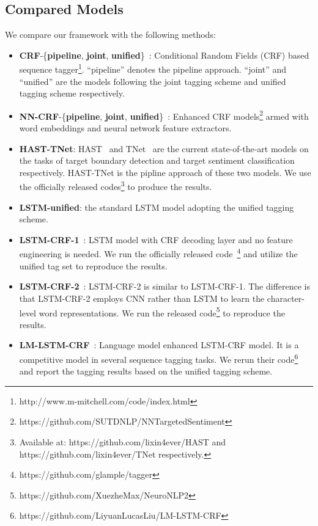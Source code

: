 \documentclass[letterpaper]{article} \usepackage{aaai19}  \usepackage{times}  \usepackage{helvet}  \usepackage{courier}  \usepackage{url}  \usepackage{graphicx}  \frenchspacing  \setlength{\pdfpagewidth}{8.5in}  \setlength{\pdfpageheight}{11in}
\begin{document}
\subsection{Compared Models}
We compare our framework with the following methods:
\begin{itemize}
    \item \textbf{CRF}-\{\textbf{pipeline}, \textbf{joint}, \textbf{unified}\}~\cite{D13-1171}: Conditional Random Fields (CRF) based sequence tagger\footnote{http://www.m-mitchell.com/code/index.html}. ``pipeline'' denotes the pipeline approach. ``joint'' and ``unified'' are the models following the joint tagging scheme and unified tagging scheme respectively.
    \item \textbf{NN-CRF}-\{\textbf{pipeline}, \textbf{joint}, \textbf{unified}\}~\cite{D15-1073}: Enhanced CRF models\footnote{https://github.com/SUTDNLP/NNTargetedSentiment} armed with word embeddings and neural network feature extractors.
    \item \textbf{HAST-TNet}: HAST~\cite{li2018aspect} and TNet~\cite{P18-1087} are the current state-of-the-art models on the tasks of target boundary detection and target sentiment classification respectively. HAST-TNet is the pipline approach of these two models. We use the officially released codes\footnote{Available at: https://github.com/lixin4ever/HAST and  https://github.com/lixin4ever/TNet respectively.} to produce the results.
    \item \textbf{LSTM-unified}: the standard LSTM model adopting the unified tagging scheme.
    \item \textbf{LSTM-CRF-1}~\cite{N16-1030}: LSTM model with CRF decoding layer and no feature engineering is needed. We run the officially released code~\footnote{https://github.com/glample/tagger} and utilize the unified tag set to reproduce the results. 
    \item \textbf{LSTM-CRF-2}~\cite{P16-1101}: LSTM-CRF-2 is similar to LSTM-CRF-1. The difference is that LSTM-CRF-2 employs CNN rather than LSTM to learn the character-level word representations. We run the released code\footnote{https://github.com/XuezheMax/NeuroNLP2} to reproduce the results.
    \item \textbf{LM-LSTM-CRF}~\cite{liu2017empower}: Language model enhanced LSTM-CRF model. It is a competitive model in several sequence tagging tasks. We rerun their code\footnote{https://github.com/LiyuanLucasLiu/LM-LSTM-CRF} and report the tagging results based on the unified tagging scheme.
\end{itemize}
\end{document}
